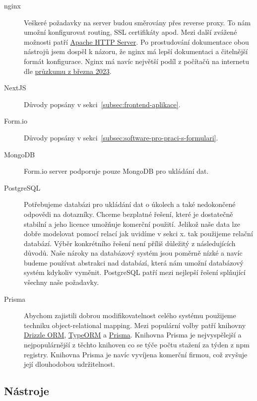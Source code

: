 \begin{description}
    \item[nginx]
    Veškeré požadavky na server budou směrovány přes reverse proxy.
    To nám umožní konfigurovat routing, SSL certifikáty apod.
    Mezi další zvážené možnosti patří \href{https://httpd.apache.org/}{Apache HTTP Server}.
    Po prostudování dokumentace obou nástrojů jsem dospěl k názoru, že nginx má lepší dokumentaci a čitelnější formát konfigurace.
    Nginx má navíc největší podíl z počítačů na internetu dle \href{https://news.netcraft.com/archives/category/web-server-survey/}{průzkumu z března 2023}.
    \item[NextJS]
    Důvody popsány v sekci~\ref{subsec:frontend-aplikace}.
    \item[Form.io]
    Důvody popsány v sekci~\ref{subsec:software-pro-praci-s-formulari}.
    \item[MongoDB]
    Form.io server podporuje pouze MongoDB pro ukládání dat\@.
    \item[PostgreSQL]
    Potřebujeme databázi pro ukládání dat o úkolech a také nedokončené odpovědi na dotazníky.
    Chceme bezplatné řešení, které je dostatečně stabilní a jeho licence umožňuje komerční použití.
    Jelikož naše data lze dobře modelovat pomocí relací jak uvidíme v sekci x. %
    tak použijeme relační databází.
    Výběr konkrétního řešení není příliš důležitý z následujících důvodů.
    Naše nároky na databázový systém jsou poměrně nízké a navíc budeme používat abstrakci nad databází, která nám umožní databázový systém kdykoliv vyměnit.
    PostgreSQL patří mezi nejlepší řešení splňující všechny naše požadavky.
    \item[Prisma]
    Abychom zajistili dobrou modifikovatelnost celého systému použijeme techniku object-relational mapping.
    Mezi populární volby patří knihovny \href{https://github.com/drizzle-team/drizzle-orm}{Drizzle ORM}, \href{https://github.com/typeorm/typeorm}{TypeORM} a \href{https://github.com/prisma/prisma}{Prisma}.
    Knihovna Prisma je nejvyspělejší a nejpopulárnější z těchto knihoven co se týče počtu stažení za týden z npm registry.
    Knihovna Prisma je navíc vyvíjena komerční firmou, což zvyšuje její dlouhodobou udržitelnost.
\end{description}

\subsection{Nástroje}\label{subsec:nastroje}

